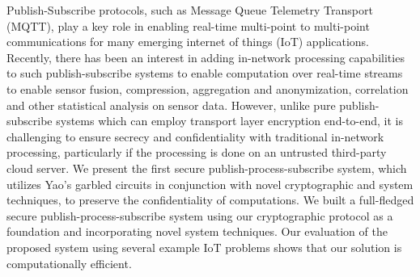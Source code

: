 Publish-Subscribe protocols, such as Message Queue Telemetry Transport
(MQTT), play a key role in enabling real-time multi-point to multi-point
communications for many emerging internet of things (IoT) applications.
Recently, there has been an interest in adding in-network processing
capabilities to such publish-subscribe systems to enable computation over
real-time streams to enable sensor fusion, compression, aggregation and
anonymization, correlation and other statistical analysis on sensor data.
However, unlike pure publish-subscribe systems which can employ transport
layer encryption end-to-end, it is challenging to ensure secrecy and confidentiality
with traditional in-network processing, particularly if the processing is
done on an untrusted third-party cloud server. We present the first secure
publish-process-subscribe system, which utilizes Yao's garbled circuits in
conjunction with novel cryptographic and system techniques, to preserve the
confidentiality of computations. We built a full-fledged secure
publish-process-subscribe system using our cryptographic protocol as a
foundation and incorporating novel system techniques. Our evaluation of the
proposed system using several example IoT problems shows that our solution
is computationally efficient.
